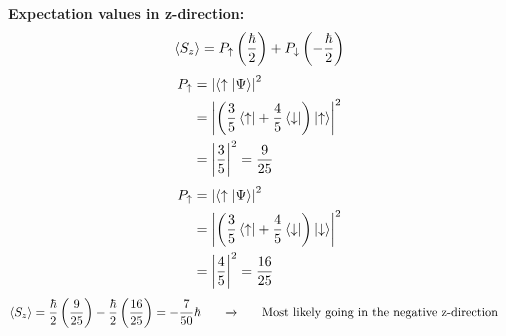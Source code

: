 \documentclass[12pt]{article}
\begin{document}
\textbf{Expectation values in z-direction:} \\
\[
 \braket{S_z} = P_{\uparrow}\left(\frac{\hbar}{2}\right) + P_{\downarrow}\left(-\frac{\hbar}{2}\right)
\]
\begin{equation}
    \begin{split}
        P_{\uparrow} &= \left|\braket{\uparrow|\Psi}\right|^2 \\
        &= \left|\left(\frac{3}{5}\bra{\uparrow} + \frac{4}{5}\bra{\downarrow}\right)\ket{\uparrow}\right|^2 \\
        &= \left|\frac{3}{5}\right|^2 = \frac{9}{25}
    \end{split}
\end{equation}
\begin{equation}
    \begin{split}
        P_{\uparrow} &= \left|\braket{\uparrow|\Psi}\right|^2 \\
        &= \left|\left(\frac{3}{5}\bra{\uparrow} + \frac{4}{5}\bra{\downarrow}\right)\ket{\downarrow}\right|^2 \\
        &= \left|\frac{4}{5}\right|^2 = \frac{16 }{25}
    \end{split}
\end{equation}
\begin{equation}
    \begin{split}
        \braket{S_z} &= \frac{\hbar}{2}\left(\frac{9}{25}\right) - \frac{\hbar}{2}\left(\frac{16}{25}\right) = -\frac{7}{50}\hbar \text{\qquad \rightarrowfill \qquad Most likely going in the negative z-direction}
    \end{split}
\end{equation}
\end{document}
